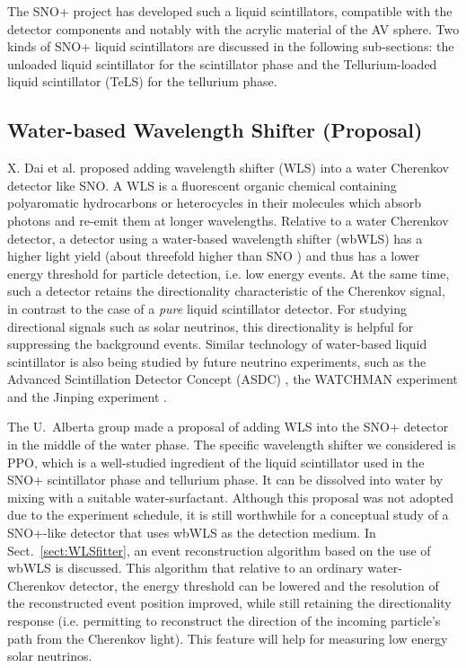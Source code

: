 The SNO+ project has developed such a liquid scintillators, compatible with the detector components and notably with the acrylic material of the AV sphere. Two kinds of SNO+ liquid scintillators are discussed in the following sub-sections: the unloaded liquid scintillator for the scintillator phase and the Tellurium-loaded liquid scintillator (TeLS) for the tellurium phase.

\subsection{Water-based Wavelength Shifter (Proposal)}\label{sect:wbWLS}

X. Dai et al. \cite{dai2008wavelength} proposed adding wavelength shifter (WLS) into a water Cherenkov detector like SNO. A WLS is a fluorescent organic chemical containing polyaromatic hydrocarbons or heterocycles in their molecules which absorb photons and re-emit them at longer wavelengths\cite{dai2008wavelength,wavelengthShifterWebsite}. Relative to a water Cherenkov detector, a detector using a water-based wavelength shifter (wbWLS) has a higher light yield (about threefold higher than SNO \cite{dai2008wavelength}) and thus has a lower energy threshold for particle detection, i.e. low energy events. At the same time, such a detector retains the directionality characteristic of the Cherenkov signal, in contrast to the case of a \emph{pure} liquid scintillator detector. For studying directional signals such as solar neutrinos, this directionality is helpful for suppressing the background events. Similar technology of water-based liquid scintillator is also being studied by future neutrino experiments, such as the Advanced Scintillation Detector Concept (ASDC) \cite{alonso2014advanced}, the WATCHMAN experiment \cite{askins2015physics} and the Jinping experiment \cite{beacom2017physics}.

The U.~Alberta group made a proposal of adding WLS into the SNO+ detector in the middle of the water phase. The specific wavelength shifter we considered is PPO, which is a well-studied ingredient of the liquid scintillator used in the SNO+ scintillator phase and tellurium phase. It can be dissolved into water by mixing with a suitable water-surfactant. Although this proposal was not adopted due to the experiment schedule, it is still worthwhile for a conceptual study of a SNO+-like detector that uses wbWLS as the detection medium. In Sect.~\ref{sect:WLSfitter}, an event reconstruction algorithm based on the use of wbWLS is discussed. This algorithm that relative to an ordinary water-Cherenkov detector, the energy threshold can be lowered and the resolution of the reconstructed event position improved, while still retaining the directionality response (i.e. permitting to reconstruct the direction of the incoming particle's path from the Cherenkov light). This feature will help for measuring low energy solar neutrinos.

